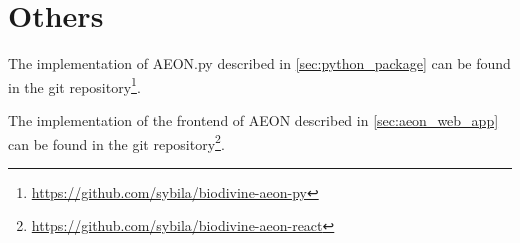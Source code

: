 \section*{Others}
The implementation of AEON.py described in \autoref{sec:python_package} can be found in the git repository\footnote{\url{https://github.com/sybila/biodivine-aeon-py}}. 

The implementation of the frontend of AEON described in \autoref{sec:aeon_web_app} can be found in the git repository\footnote{\url{https://github.com/sybila/biodivine-aeon-react}}.